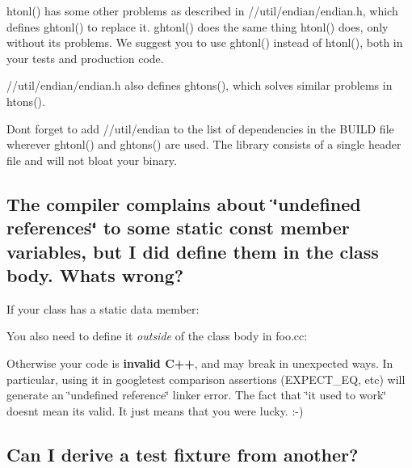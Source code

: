{\ttfamily htonl()} has some other problems as described in {\ttfamily //util/endian/endian.h}, which defines {\ttfamily ghtonl()} to replace it. {\ttfamily ghtonl()} does the same thing {\ttfamily htonl()} does, only without its problems. We suggest you to use {\ttfamily ghtonl()} instead of {\ttfamily htonl()}, both in your tests and production code.

{\ttfamily //util/endian/endian.h} also defines {\ttfamily ghtons()}, which solves similar problems in {\ttfamily htons()}.

Don\textquotesingle{}t forget to add {\ttfamily //util/endian} to the list of dependencies in the {\ttfamily B\+U\+I\+LD} file wherever {\ttfamily ghtonl()} and {\ttfamily ghtons()} are used. The library consists of a single header file and will not bloat your binary.

\subsection*{The compiler complains about \char`\"{}undefined references\char`\"{} to some static const member variables, but I did define them in the class body. What\textquotesingle{}s wrong?}

If your class has a static data member\+:


\begin{DoxyCode}{0}
\DoxyCodeLine{\};}
\end{DoxyCode}


You also need to define it {\itshape outside} of the class body in {\ttfamily foo.\+cc}\+:


\begin{DoxyCode}{0}
\end{DoxyCode}


Otherwise your code is {\bfseries{invalid C++}}, and may break in unexpected ways. In particular, using it in googletest comparison assertions ({\ttfamily E\+X\+P\+E\+C\+T\+\_\+\+EQ}, etc) will generate an \char`\"{}undefined reference\char`\"{} linker error. The fact that \char`\"{}it used to work\char`\"{} doesn\textquotesingle{}t mean it\textquotesingle{}s valid. It just means that you were lucky. \+:-\/)

\subsection*{Can I derive a test fixture from another?}

